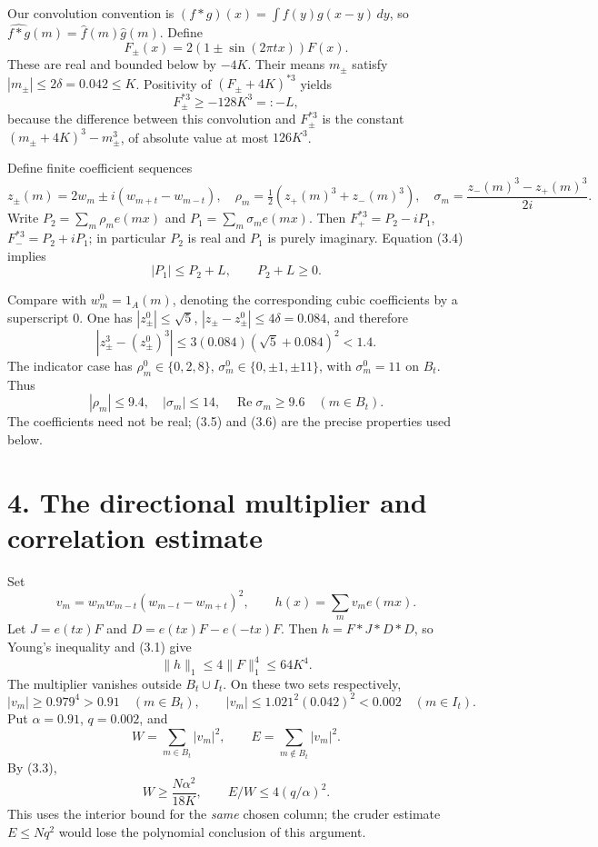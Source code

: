 \documentclass[11pt]{article}
\begin{document}
Our convolution convention is \((f*g)(x)=\int f(y)g(x-y)\,dy\), so \(\widehat{f*g}(m)=\widehat f(m)\widehat g(m)\). Define
\[
F_\pm(x)=2(1\pm\sin(2\pi tx))F(x).
\]
These are real and bounded below by \(-4K\). Their means \(m_\pm\) satisfy \(|m_\pm|\leq2\delta=0.042\leq K\). Positivity of \((F_\pm+4K)^{*3}\) yields
\[
F_\pm^{*3}\geq-128K^3=:-L,
\tag{3.4}
\]
because the difference between this convolution and \(F_\pm^{*3}\) is the constant \((m_\pm+4K)^3-m_\pm^3\), of absolute value at most \(126K^3\).

Define finite coefficient sequences
\[
z_\pm(m)=2w_m\pm i(w_{m+t}-w_{m-t}),\quad
\rho_m=\tfrac12(z_+(m)^3+z_-(m)^3),\quad
\sigma_m=\frac{z_-(m)^3-z_+(m)^3}{2i}.
\]
Write \(P_2=\sum_m\rho_me(mx)\) and \(P_1=\sum_m\sigma_me(mx)\). Then \(F_+^{*3}=P_2-iP_1\), \(F_-^{*3}=P_2+iP_1\); in particular \(P_2\) is real and \(P_1\) is purely imaginary. Equation (3.4) implies
\[
|P_1|\leq P_2+L,\qquad P_2+L\geq0.
\tag{3.5}
\]

Compare with \(w_m^0=1_A(m)\), denoting the corresponding cubic coefficients by a superscript 0. One has \(|z_\pm^0|\leq\sqrt5\), \(|z_\pm-z_\pm^0|\leq4\delta=0.084\), and therefore
\[
|z_\pm^3-(z_\pm^0)^3|\leq3(0.084)(\sqrt5+0.084)^2<1.4.
\]
The indicator case has \(\rho_m^0\in\{0,2,8\}\), \(\sigma_m^0\in\{0,\pm1,\pm11\}\), with \(\sigma_m^0=11\) on \(B_t\). Thus
\[
|\rho_m|\leq9.4,\quad |\sigma_m|\leq14,\quad
\operatorname{Re}\sigma_m\geq9.6\quad(m\in B_t).
\tag{3.6}
\]
The coefficients need not be real; (3.5) and (3.6) are the precise properties used below.

\section*{4. The directional multiplier and correlation estimate}

Set
\[
v_m=w_mw_{m-t}(w_{m-t}-w_{m+t})^2,\qquad h(x)=\sum_m v_me(mx).
\]
Let \(J=e(tx)F\) and \(D=e(tx)F-e(-tx)F\). Then \(h=F*J*D*D\), so Young's inequality and (3.1) give
\[
\|h\|_1\leq4\|F\|_1^4\leq64K^4.
\tag{4.1}
\]
The multiplier vanishes outside \(B_t\cup I_t\). On these two sets respectively,
\[
|v_m|\geq0.979^4>0.91\quad(m\in B_t),\qquad
|v_m|\leq1.021^2(0.042)^2<0.002\quad(m\in I_t).
\]
Put \(\alpha=0.91\), \(q=0.002\), and
\[
W=\sum_{m\in B_t}|v_m|^2,\qquad E=\sum_{m\notin B_t}|v_m|^2.
\]
By (3.3),
\[
W\geq\frac{N\alpha^2}{18K},\qquad E/W\leq4(q/\alpha)^2.
\tag{4.2}
\]
This uses the interior bound for the \emph{same} chosen column; the cruder estimate \(E\leq Nq^2\) would lose the polynomial conclusion of this argument.
\end{document}
